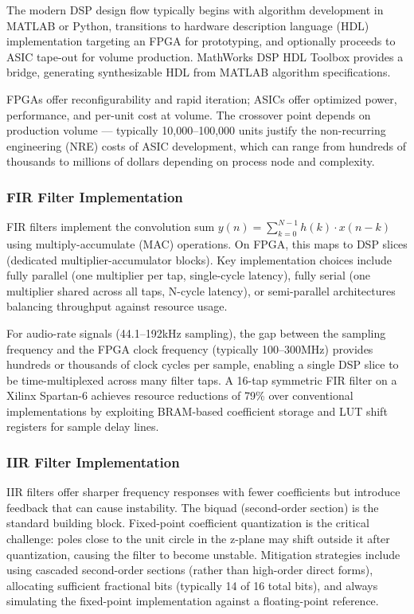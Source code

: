 \documentclass[11pt,letterpaper]{article}
\begin{document}
The modern DSP design flow typically begins with algorithm development in MATLAB or Python, transitions to hardware description language (HDL) implementation targeting an FPGA for prototyping, and optionally proceeds to ASIC tape-out for volume production. MathWorks DSP HDL Toolbox provides a bridge, generating synthesizable HDL from MATLAB algorithm specifications.

FPGAs offer reconfigurability and rapid iteration; ASICs offer optimized power, performance, and per-unit cost at volume. The crossover point depends on production volume --- typically 10,000--100,000 units justify the non-recurring engineering (NRE) costs of ASIC development, which can range from hundreds of thousands to millions of dollars depending on process node and complexity.

\subsubsection{FIR Filter Implementation}

FIR filters implement the convolution sum $y(n) = \sum_{k=0}^{N-1} h(k) \cdot x(n-k)$ using multiply-accumulate (MAC) operations. On FPGA, this maps to DSP slices (dedicated multiplier-accumulator blocks). Key implementation choices include fully parallel (one multiplier per tap, single-cycle latency), fully serial (one multiplier shared across all taps, N-cycle latency), or semi-parallel architectures balancing throughput against resource usage.

For audio-rate signals (44.1--192kHz sampling), the gap between the sampling frequency and the FPGA clock frequency (typically 100--300MHz) provides hundreds or thousands of clock cycles per sample, enabling a single DSP slice to be time-multiplexed across many filter taps. A 16-tap symmetric FIR filter on a Xilinx Spartan-6 achieves resource reductions of 79\% over conventional implementations by exploiting BRAM-based coefficient storage and LUT shift registers for sample delay lines.

\subsubsection{IIR Filter Implementation}

IIR filters offer sharper frequency responses with fewer coefficients but introduce feedback that can cause instability. The biquad (second-order section) is the standard building block. Fixed-point coefficient quantization is the critical challenge: poles close to the unit circle in the z-plane may shift outside it after quantization, causing the filter to become unstable. Mitigation strategies include using cascaded second-order sections (rather than high-order direct forms), allocating sufficient fractional bits (typically 14 of 16 total bits), and always simulating the fixed-point implementation against a floating-point reference.
\end{document}
